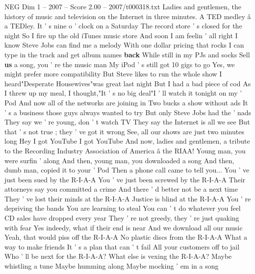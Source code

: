 \begin{textsample}{NEG Dim 1 – 2007 – Score 2.00 – 2007/t000318.txt}  \label{ex:f1_neg_059}
Ladies and gentlemen, the history of music and television on the Internet in three minutes.
A TED medley â a TEDley.
It ' s nine o ' clock on a Saturday The record store ' s closed for the night So I fire up the old iTunes music store And soon I am feelin ' all right I know Steve Jobs can find me a melody With one dollar pricing that rocks I can type in the track and get album names \textbf{back} While still in my PJs and socks Sell \textbf{us} a song, you ' re the music man My iPod ' s still got 10 gigs to go Yes, we might prefer more compatibility But Steve likes to run the whole show I heard"Desperate Housewives"was great last night But I had a bad piece of cod As I threw up my meal, I thought,"It ' s no big deal"I ' ll watch it tonight on my ' Pod And now all of the networks are joining in Two bucks a show without ads It ' s a business those guys always wanted to try But only Steve Jobs had the ' nads They say we ' re young, don ' t watch TV They say the Internet is all we see But that ' s not true ; they ' ve got it wrong See, all our shows are just two minutes long Hey I got YouTube I got YouTube And now, ladies and gentlemen, a tribute to the Recording Industry Association of America â the RIAA!
Young man, you were surfin ' along And then, young man, you downloaded a song And then, dumb man, copied it to your ' Pod Then a phone call came to tell you...
You ' ve just been sued by the R-I-A-A You ' ve just been screwed by the R-I-A-A Their attorneys say you committed a crime And there ' d better not be a next time They ' ve lost their minds at the R-I-A-A Justice is blind at the R-I-A-A You ' re depriving the bands You are learning to steal You can ' t do whatever you feel CD sales have dropped every year They ' re not greedy, they ' re just quaking with fear Yes indeedy, what if their end is near And we download all our music Yeah, that would piss off the R-I-A-A No plastic discs from the R-I-A-A What a way to make friends It ' s a plan that can ' t fail All your customers off to jail Who ' ll be next for the R-I-A-A?
What else is vexing the R-I-A-A?
Maybe whistling a tune Maybe humming along Maybe mocking ' em in a song

\end{textsample}
